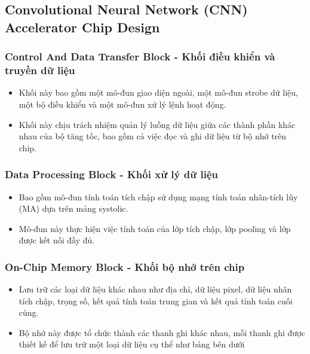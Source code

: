\subsection{Convolutional Neural Network (CNN) Accelerator Chip Design}
\subsubsection{Control And Data Transfer Block - Khối điều khiển và truyền dữ liệu}
\begin{itemize}
    \item Khối này bao gồm một mô-đun giao diện ngoài, một mô-đun strobe dữ liệu, một bộ điều khiển và một mô-đun xử lý lệnh hoạt động.
    \item Khối này chịu trách nhiệm quản lý luồng dữ liệu giữa các thành phần khác nhau của bộ tăng tốc, bao gồm cả việc đọc và ghi dữ liệu từ bộ nhớ trên chip.
\end{itemize}
\subsubsection{Data Processing Block - Khối xử lý dữ liệu}
\begin{itemize}
    \item Bao gồm mô-đun tính toán tích chập sử dụng mạng tính toán nhân-tích lũy (MA) dựa trên mảng systolic.
    \item Mô-đun này thực hiện việc tính toán của lớp tích chập, lớp pooling và lớp được kết nối đầy đủ.
\end{itemize}
\subsubsection{On-Chip Memory Block - Khối bộ nhớ trên chip}
\begin{itemize}
    \item Lưu trữ các loại dữ liệu khác nhau như địa chỉ, dữ liệu pixel, dữ liệu nhân tích chập, trọng số, kết quả tính toán trung gian và kết quả tính toán cuối cùng.
    \item Bộ nhớ này được tổ chức thành các thanh ghi khác nhau, mỗi thanh ghi được thiết kế để lưu trữ một loại dữ liệu cụ thể như bảng bên dưới
\end{itemize}
